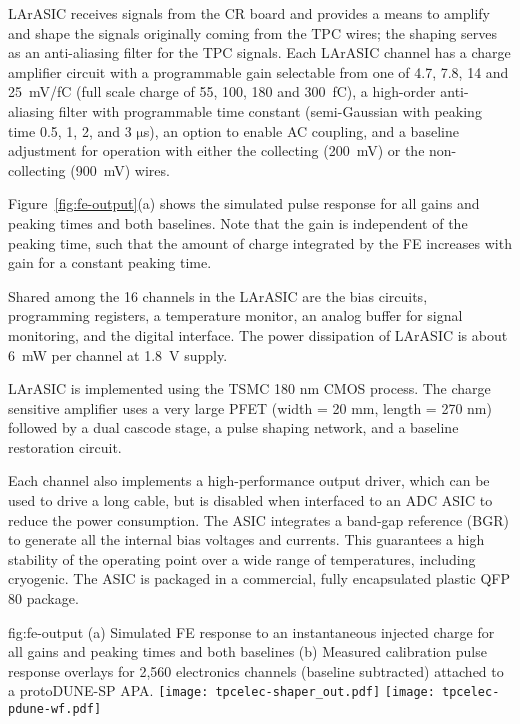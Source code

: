 
LArASIC receives signals from the CR board and
provides a means to amplify and shape the signals originally coming from the TPC wires; the
shaping serves as an anti-aliasing filter for the TPC signals.
Each LArASIC channel has a charge amplifier circuit with a programmable
gain selectable from one of 4.7, 7.8, 14 and 25~mV/fC
(full scale charge of 55, 100, 180 and 300~fC),
a high-order anti-aliasing filter with programmable time
constant (semi-Gaussian with peaking time 0.5, 1, 2, and 3 $\mathrm{\mu}$s),
an option to enable AC coupling,
and a baseline adjustment for operation with either the collecting (200~mV) or the non-collecting (900~mV) wires.

Figure~\ref{fig:fe-output}(a) shows the simulated pulse response for all gains and peaking times and both baselines.
Note that the gain is independent of the peaking time, such that the amount of charge integrated by the FE increases with gain for a constant peaking time.

Shared among the 16 channels in the LArASIC are the bias circuits, programming registers,
a temperature monitor, an analog buffer for signal monitoring, and the digital interface.
The power dissipation of LArASIC is about 6~mW per channel at 1.8~V supply.

LArASIC is implemented using the TSMC 180 nm CMOS process.  The charge sensitive amplifier uses a very large PFET (width = 20 mm, length = 270 nm) followed by a dual cascode stage, a pulse shaping network, and a baseline restoration circuit.  

Each channel also implements a high-performance output driver,
which can be used to drive a long cable, but is disabled when interfaced to an ADC ASIC to reduce the power consumption.
The ASIC integrates a band-gap reference (BGR) to generate all the internal bias voltages and currents.
This guarantees a high stability of the operating point over a wide range of
temperatures, including cryogenic.
The ASIC is packaged in a commercial, fully encapsulated plastic QFP 80 package.

\begin{dunefigure}
{fig:fe-output}
{(a) Simulated FE response to an instantaneous injected charge for all gains and peaking times and both baselines (b) Measured calibration pulse response overlays for 2,560 electronics channels (baseline subtracted) attached to a protoDUNE-SP APA. }
\texttt{[image: tpcelec-shaper\_out.pdf]}
\texttt{[image: tpcelec-pdune-wf.pdf]}
\end{dunefigure}

